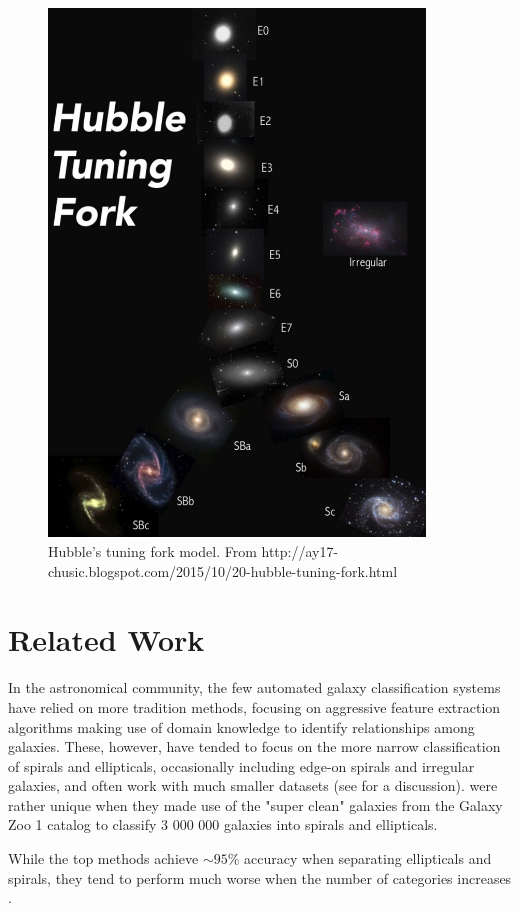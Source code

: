 \documentclass{article}
\begin{document}
\begin{figure}[h]
  \centering
	\includegraphics[width=100mm]{../img/tuningFork.pdf}
  \caption{Hubble's tuning fork model. From http://ay17-chusic.blogspot.com/2015/10/20-hubble-tuning-fork.html}
  \label{fig:tuningFork}
\end{figure}


\section{Related Work}
\label{gen_inst}
In the astronomical community, the few automated galaxy classification systems have relied on more tradition methods, focusing on aggressive feature extraction algorithms making use of domain knowledge to identify relationships among galaxies. These, however, have tended to focus on the more narrow classification of spirals and ellipticals, occasionally including edge-on spirals and irregular galaxies, and often work with much smaller datasets (see \citealt{2015MNRAS.450.1441D} for a discussion). \cite{2016ApJS..223...20K} were rather unique when they made use of the "super clean" galaxies from the Galaxy Zoo 1 catalog \citep{2008MNRAS.389.1179L} to classify 3 000 000 galaxies into spirals and ellipticals.

While the top methods achieve $\sim95\%$ accuracy when separating ellipticals and spirals, they tend to perform much worse when the number of categories increases \citep{2004MNRAS.349...87D}.
\end{document}
